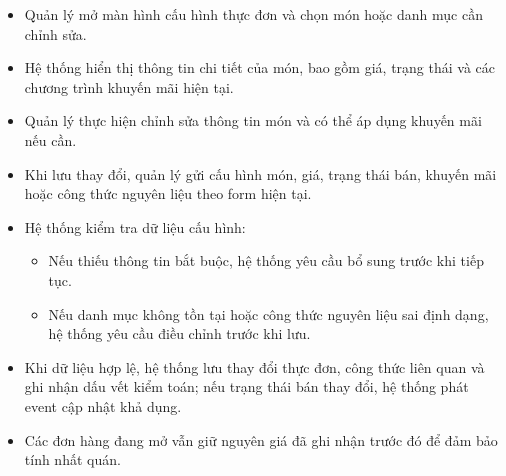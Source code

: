 \begin{itemize}
    \item Quản lý mở màn hình cấu hình thực đơn và chọn món hoặc danh mục cần chỉnh sửa.
    
    \item Hệ thống hiển thị thông tin chi tiết của món, bao gồm giá, trạng thái và các chương trình khuyến mãi hiện tại.
    
    \item Quản lý thực hiện chỉnh sửa thông tin món và có thể áp dụng khuyến mãi nếu cần.
    
    \item Khi lưu thay đổi, quản lý gửi cấu hình món, giá, trạng thái bán, khuyến mãi hoặc công thức nguyên liệu theo form hiện tại.
    
    \item Hệ thống kiểm tra dữ liệu cấu hình:
    \begin{itemize}
        \item Nếu thiếu thông tin bắt buộc, hệ thống yêu cầu bổ sung trước khi tiếp tục.
        \item Nếu danh mục không tồn tại hoặc công thức nguyên liệu sai định dạng, hệ thống yêu cầu điều chỉnh trước khi lưu.
    \end{itemize}
    
    \item Khi dữ liệu hợp lệ, hệ thống lưu thay đổi thực đơn, công thức liên quan và ghi nhận dấu vết kiểm toán; nếu trạng thái bán thay đổi, hệ thống phát event cập nhật khả dụng.
    
    \item Các đơn hàng đang mở vẫn giữ nguyên giá đã ghi nhận trước đó để đảm bảo tính nhất quán.
\end{itemize}
